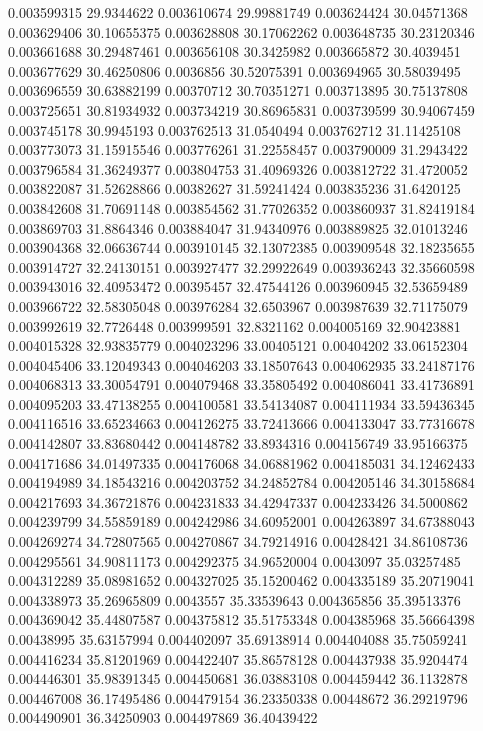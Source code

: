 0.003599315	29.9344622
0.003610674	29.99881749
0.003624424	30.04571368
0.003629406	30.10655375
0.003628808	30.17062262
0.003648735	30.23120346
0.003661688	30.29487461
0.003656108	30.3425982
0.003665872	30.4039451
0.003677629	30.46250806
0.0036856	30.52075391
0.003694965	30.58039495
0.003696559	30.63882199
0.00370712	30.70351271
0.003713895	30.75137808
0.003725651	30.81934932
0.003734219	30.86965831
0.003739599	30.94067459
0.003745178	30.9945193
0.003762513	31.0540494
0.003762712	31.11425108
0.003773073	31.15915546
0.003776261	31.22558457
0.003790009	31.2943422
0.003796584	31.36249377
0.003804753	31.40969326
0.003812722	31.4720052
0.003822087	31.52628866
0.00382627	31.59241424
0.003835236	31.6420125
0.003842608	31.70691148
0.003854562	31.77026352
0.003860937	31.82419184
0.003869703	31.8864346
0.003884047	31.94340976
0.003889825	32.01013246
0.003904368	32.06636744
0.003910145	32.13072385
0.003909548	32.18235655
0.003914727	32.24130151
0.003927477	32.29922649
0.003936243	32.35660598
0.003943016	32.40953472
0.00395457	32.47544126
0.003960945	32.53659489
0.003966722	32.58305048
0.003976284	32.6503967
0.003987639	32.71175079
0.003992619	32.7726448
0.003999591	32.8321162
0.004005169	32.90423881
0.004015328	32.93835779
0.004023296	33.00405121
0.00404202	33.06152304
0.004045406	33.12049343
0.004046203	33.18507643
0.004062935	33.24187176
0.004068313	33.30054791
0.004079468	33.35805492
0.004086041	33.41736891
0.004095203	33.47138255
0.004100581	33.54134087
0.004111934	33.59436345
0.004116516	33.65234663
0.004126275	33.72413666
0.004133047	33.77316678
0.004142807	33.83680442
0.004148782	33.8934316
0.004156749	33.95166375
0.004171686	34.01497335
0.004176068	34.06881962
0.004185031	34.12462433
0.004194989	34.18543216
0.004203752	34.24852784
0.004205146	34.30158684
0.004217693	34.36721876
0.004231833	34.42947337
0.004233426	34.5000862
0.004239799	34.55859189
0.004242986	34.60952001
0.004263897	34.67388043
0.004269274	34.72807565
0.004270867	34.79214916
0.00428421	34.86108736
0.004295561	34.90811173
0.004292375	34.96520004
0.0043097	35.03257485
0.004312289	35.08981652
0.004327025	35.15200462
0.004335189	35.20719041
0.004338973	35.26965809
0.0043557	35.33539643
0.004365856	35.39513376
0.004369042	35.44807587
0.004375812	35.51753348
0.004385968	35.56664398
0.00438995	35.63157994
0.004402097	35.69138914
0.004404088	35.75059241
0.004416234	35.81201969
0.004422407	35.86578128
0.004437938	35.9204474
0.004446301	35.98391345
0.004450681	36.03883108
0.004459442	36.1132878
0.004467008	36.17495486
0.004479154	36.23350338
0.00448672	36.29219796
0.004490901	36.34250903
0.004497869	36.40439422
